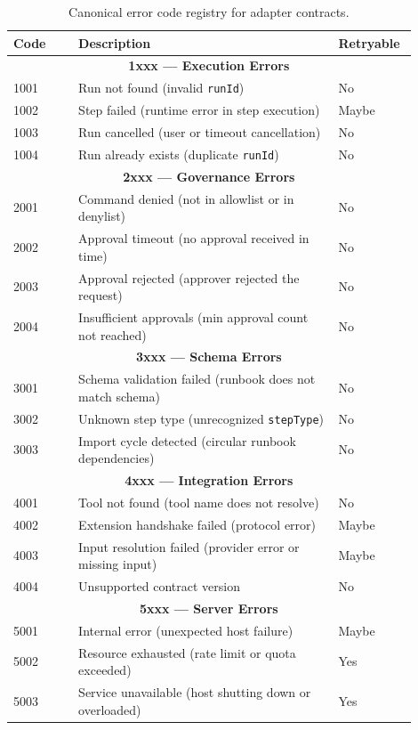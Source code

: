 \begin{table}[ht]
\centering
\begin{tabular}{p{0.15\linewidth}p{0.60\linewidth}p{0.15\linewidth}}
\hline
\textbf{Code} & \textbf{Description} & \textbf{Retryable} \\
\hline
\multicolumn{3}{c}{\textbf{1xxx — Execution Errors}} \\
\hline
1001 & Run not found (invalid \texttt{runId}) & No \\
1002 & Step failed (runtime error in step execution) & Maybe \\
1003 & Run cancelled (user or timeout cancellation) & No \\
1004 & Run already exists (duplicate \texttt{runId}) & No \\
\hline
\multicolumn{3}{c}{\textbf{2xxx — Governance Errors}} \\
\hline
2001 & Command denied (not in allowlist or in denylist) & No \\
2002 & Approval timeout (no approval received in time) & No \\
2003 & Approval rejected (approver rejected the request) & No \\
2004 & Insufficient approvals (min approval count not reached) & No \\
\hline
\multicolumn{3}{c}{\textbf{3xxx — Schema Errors}} \\
\hline
3001 & Schema validation failed (runbook does not match schema) & No \\
3002 & Unknown step type (unrecognized \texttt{stepType}) & No \\
3003 & Import cycle detected (circular runbook dependencies) & No \\
\hline
\multicolumn{3}{c}{\textbf{4xxx — Integration Errors}} \\
\hline
4001 & Tool not found (tool name does not resolve) & No \\
4002 & Extension handshake failed (protocol error) & Maybe \\
4003 & Input resolution failed (provider error or missing input) & Maybe \\
4004 & Unsupported contract version & No \\
\hline
\multicolumn{3}{c}{\textbf{5xxx — Server Errors}} \\
\hline
5001 & Internal error (unexpected host failure) & Maybe \\
5002 & Resource exhausted (rate limit or quota exceeded) & Yes \\
5003 & Service unavailable (host shutting down or overloaded) & Yes \\
\hline
\end{tabular}
\caption{Canonical error code registry for adapter contracts.}
\label{tab:error-codes}
\end{table}

